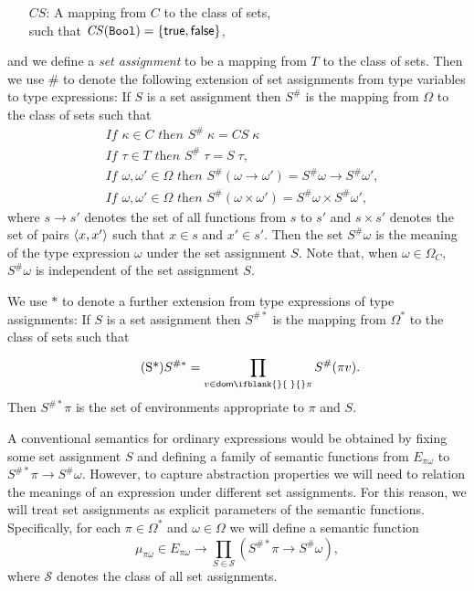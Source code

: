 \documentclass[sigplan,screen,nonacm,balance=false]{acmart}
\theoremstyle{plain}
\DeclarePairedDelimiter{\set}{\{}{\}}
\DeclarePairedDelimiter{\pair}{\langle}{\rangle}
\newcommand{\Bool}{\mathtt{Bool}}
\newcommand{\dom}[1]{\mathsf{dom}\ifblank{#1}{\;}{#1}}
\newcommand{\true}{\mathsf{true}}
\newcommand{\false}{\mathsf{false}}
\newcommand{\CS}{\mathit{CS}}
\begin{document}
\begin{itemize}[noitemsep,leftmargin=3em]
  \item[$\CS$:] A mapping from $C$ to the class of sets, \\
  such that $\CS(\Bool) = \set{\true, \false}$,
\end{itemize}
%
and we define a \emph{set assignment} to be a mapping from $T$ to the class of sets.
Then we use $\#$ to denote the following extension of set assignments from type variables to type expressions:
If $S$ is a set assignment then $S^\#$ is the mapping from $\Omega$ to the class of sets such that
%
\begin{align}
  \tag{S1}
  &\textit{If } \kappa \in C \textit{ then } S^\# \; \kappa = \CS \; \kappa \\
  \tag{S2}
  &\textit{If } \tau \in T \textit{ then } S^\# \; \tau = S \; \tau, \\
  \tag{S3}
  &\textit{If } \omega, \omega' \in \Omega \textit{ then } S^\# (\omega \to \omega') = S^\# \omega \to S^\# \omega', \\
  \tag{S4}\label{S4}
  &\textit{If } \omega, \omega' \in \Omega \textit{ then } S^\#(\omega \times \omega') = S^\# \omega \times S^\# \omega',
\end{align}
%
where $s \to s'$ denotes the set of all functions from $s$ to $s'$ and $s \times s'$ denotes the set of pairs $\pair{x, x'}$ such that $x \in s$ and $x' \in s'$.
Then the set $S^\# \omega$ is the meaning of the type expression $\omega$ under the set assignment $S$.
Note that, when $\omega \in \Omega_C$, $S^\# \omega$ is independent of the set assignment $S$.

We use $*$ to denote a further extension from type expressions of type assignments:
If $S$ is a set assignment then $S^{\#*}$ is the mapping from $\Omega^*$ to the class of sets such that
%
\begin{equation}\tag{S*}\label{S-star}
  S^{\#*} = \prod_{v \in \dom{} \pi}^{} S^\#(\pi v).
\end{equation}
%
Then $S^{\#*} \pi$ is the set of environments appropriate to $\pi$ and $S$.

A conventional semantics for ordinary expressions would be obtained by fixing some set assignment $S$ and defining a family of semantic functions from $E_{\pi \omega}$ to $S^{\#*} \pi \to S^{\#} \omega$.
However, to capture abstraction properties we will need to relation the meanings of an expression under different set assignments.
For this reason, we will treat set assignments as explicit parameters of the semantic functions.
Specifically, for each $\pi \in \Omega^*$ and $\omega \in \Omega$ we will define a semantic function
%
\begin{equation*}
  \mu_{\pi \omega} \in E_{\pi \omega} \to \prod_{S \in \mathcal{S}} (S^{\#*} \pi \to S^\# \omega),
\end{equation*}
%
where $\mathcal{S}$ denotes the class of all set assignments.
\end{document}
